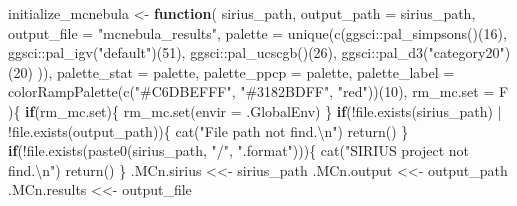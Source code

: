 \documentclass[
]{article}
\newenvironment{Shaded}{\begin{snugshade}}{\end{snugshade}}
\newcommand{\AttributeTok}[1]{\textcolor[rgb]{0.77,0.63,0.00}{#1}}
\newcommand{\ControlFlowTok}[1]{\textcolor[rgb]{0.13,0.29,0.53}{\textbf{#1}}}
\newcommand{\DecValTok}[1]{\textcolor[rgb]{0.00,0.00,0.81}{#1}}
\newcommand{\FunctionTok}[1]{\textcolor[rgb]{0.00,0.00,0.00}{#1}}
\newcommand{\NormalTok}[1]{#1}
\newcommand{\OtherTok}[1]{\textcolor[rgb]{0.56,0.35,0.01}{#1}}
\newcommand{\SpecialCharTok}[1]{\textcolor[rgb]{0.00,0.00,0.00}{#1}}
\newcommand{\StringTok}[1]{\textcolor[rgb]{0.31,0.60,0.02}{#1}}
\begin{document}
\begin{Shaded}
\begin{Highlighting}[]
\NormalTok{initialize\_mcnebula }\OtherTok{\textless{}{-}}
  \ControlFlowTok{function}\NormalTok{(}
\NormalTok{           sirius\_path,}
           \AttributeTok{output\_path =}\NormalTok{ sirius\_path,}
           \AttributeTok{output\_file =} \StringTok{"mcnebula\_results"}\NormalTok{,}
           \AttributeTok{palette =} \FunctionTok{unique}\NormalTok{(}\FunctionTok{c}\NormalTok{(ggsci}\SpecialCharTok{::}\FunctionTok{pal\_simpsons}\NormalTok{()(}\DecValTok{16}\NormalTok{),}
\NormalTok{                              ggsci}\SpecialCharTok{::}\FunctionTok{pal\_igv}\NormalTok{(}\StringTok{"default"}\NormalTok{)(}\DecValTok{51}\NormalTok{),}
\NormalTok{                              ggsci}\SpecialCharTok{::}\FunctionTok{pal\_ucscgb}\NormalTok{()(}\DecValTok{26}\NormalTok{),}
\NormalTok{                              ggsci}\SpecialCharTok{::}\FunctionTok{pal\_d3}\NormalTok{(}\StringTok{"category20"}\NormalTok{)(}\DecValTok{20}\NormalTok{)}
\NormalTok{                              )),}
           \AttributeTok{palette\_stat =}\NormalTok{ palette,}
           \AttributeTok{palette\_ppcp =}\NormalTok{ palette,}
           \AttributeTok{palette\_label =} \FunctionTok{colorRampPalette}\NormalTok{(}\FunctionTok{c}\NormalTok{(}\StringTok{"\#C6DBEFFF"}\NormalTok{, }\StringTok{"\#3182BDFF"}\NormalTok{, }\StringTok{"red"}\NormalTok{))(}\DecValTok{10}\NormalTok{),}
           \AttributeTok{rm\_mc.set =}\NormalTok{ F}
\NormalTok{           )\{}
    \ControlFlowTok{if}\NormalTok{(rm\_mc.set)\{}
      \FunctionTok{rm\_mc.set}\NormalTok{(}\AttributeTok{envir =}\NormalTok{ .GlobalEnv)}
\NormalTok{    \}}
    \ControlFlowTok{if}\NormalTok{(}\SpecialCharTok{!}\FunctionTok{file.exists}\NormalTok{(sirius\_path) }\SpecialCharTok{|} \SpecialCharTok{!}\FunctionTok{file.exists}\NormalTok{(output\_path))\{}
      \FunctionTok{cat}\NormalTok{(}\StringTok{"File path not find.}\SpecialCharTok{\textbackslash{}n}\StringTok{"}\NormalTok{)}
      \FunctionTok{return}\NormalTok{()}
\NormalTok{    \}}
    \ControlFlowTok{if}\NormalTok{(}\SpecialCharTok{!}\FunctionTok{file.exists}\NormalTok{(}\FunctionTok{paste0}\NormalTok{(sirius\_path, }\StringTok{"/"}\NormalTok{, }\StringTok{".format"}\NormalTok{)))\{}
      \FunctionTok{cat}\NormalTok{(}\StringTok{"SIRIUS project not find.}\SpecialCharTok{\textbackslash{}n}\StringTok{"}\NormalTok{)}
      \FunctionTok{return}\NormalTok{()}
\NormalTok{    \}}
\NormalTok{    .MCn.sirius }\OtherTok{\textless{}\textless{}{-}}\NormalTok{ sirius\_path}
\NormalTok{    .MCn.output }\OtherTok{\textless{}\textless{}{-}}\NormalTok{ output\_path}
\NormalTok{    .MCn.results }\OtherTok{\textless{}\textless{}{-}}\NormalTok{ output\_file}

\end{Highlighting}
\end{Shaded}
\end{document}
